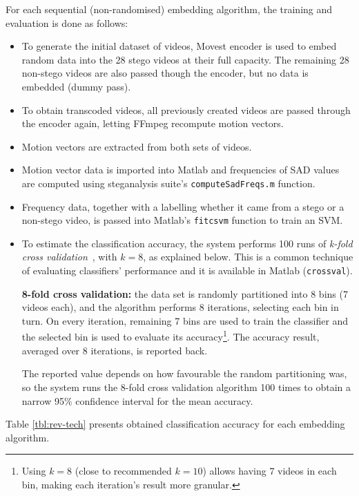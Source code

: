 \documentclass[12pt,british,twoside,notitlepage,usenames,dvipsnames,hypens,final]{report}
\numberwithin{equation}{section}
\numberwithin{figure}{section}
\begin{document}
For each sequential (non-randomised) embedding algorithm, the training and evaluation is done as follows:
\begin{itemize}
\item To generate the initial dataset of videos, Movest encoder is used to embed random data into the 28 stego videos at their full capacity. The remaining 28 non-stego videos are also passed though the encoder, but no data is embedded (dummy pass).
\item To obtain transcoded videos, all previously created videos are passed through the encoder again, letting FFmpeg recompute motion vectors.
\item Motion vectors are extracted from both sets of videos.
\item Motion vector data is imported into Matlab and frequencies of SAD values are computed using steganalysis suite's \texttt{computeSadFreqs.m} function.
\item Frequency data, together with a labelling whether it came from a stego or a non-stego video, is passed into Matlab's \texttt{fitcsvm} function to train an SVM.
\item To estimate the classification accuracy, the system performs 100 runs of \emph{k-fold cross validation}~\cite{ai2-notes}, with $k = 8$, as explained below. This is a common technique of evaluating classifiers' performance and it is available in Matlab (\texttt{crossval}).

\textbf{8-fold cross validation:} the data set is randomly partitioned into 8 bins (7 videos each), and the algorithm performs 8 iterations, selecting each bin in turn. On every iteration, remaining 7 bins are used to train the classifier and the selected bin is used to evaluate its accuracy\footnote{Using $k = 8$ (close to recommended $k = 10$) allows having 7 videos in each bin, making each iteration's result more granular.}. The accuracy result, averaged over 8 iterations, is reported back.

The reported value depends on how favourable the random partitioning was, so the system runs the 8-fold cross validation algorithm 100 times to obtain a narrow 95\% confidence interval for the mean accuracy.  

\end{itemize}

Table \ref{tbl:rev-tech} presents obtained classification accuracy for each embedding algorithm.
\end{document}
